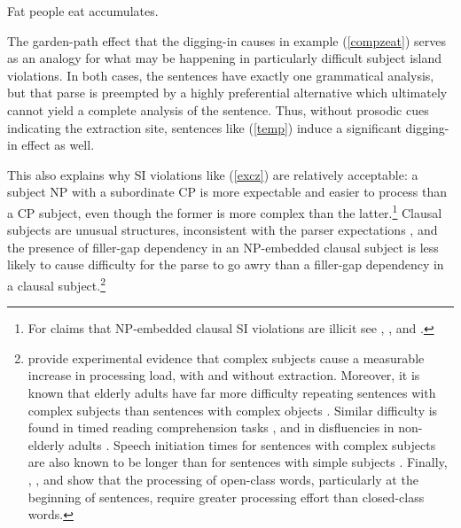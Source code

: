 \documentclass[output=paper
 	        ,biblatex
                ,babelshorthands
                ,newtxmath
                ,draftmode
                ,colorlinks, citecolor=brown
]{langscibook}
\begin{document}
\ea \label{compzeat} Fat people eat accumulates.
\z 

\noindent
The garden-path effect that the digging-in causes in example (\ref{compzeat}) serves as an analogy
for what may be happening in particularly difficult subject island violations.  In both cases, the
sentences have exactly one grammatical analysis, but that parse is preempted by a highly
preferential alternative which ultimately cannot yield a complete analysis of the sentence.  Thus,
without prosodic cues indicating the extraction site, sentences like (\ref{temp}) induce a
significant digging-in effect as well.


\eal \label{temp}
\zl

This also explains why SI violations like (\ref{excz}) are relatively acceptable: a subject NP with
a subordinate CP is more expectable and easier to process than a CP subject, even though the former
is more complex than the latter.\footnote{For claims that NP-embedded clausal SI violations are
  illicit see \citet[42]{lasniksaito}, \citet[796]{colinphillips}, and \citet[67]{colin_horn}.}
Clausal subjects are unusual structures, inconsistent with the parser expectations \citep{fod74},
and the presence of filler-gap dependency in an NP-embedded clausal subject is less likely to cause
difficulty for the parse to go awry than a filler-gap dependency in a clausal
subject.\footnote{\citet{clausen,clausencuny} provide experimental evidence that complex subjects
  cause a measurable increase in processing load, with and without extraction. Moreover, it is known
  that elderly adults have far more difficulty repeating sentences with complex subjects than
  sentences with complex objects \citep{kemper86}. Similar difficulty is found in timed reading
  comprehension tasks \citep{kynette}, and in disfluencies in non-elderly adults \citep{clarkwasow}.
  Speech initiation times for sentences with complex subjects are also known to be longer than for
  sentences with simple subjects \citep{ferreirasubj,tsiam}.  Finally, \citet{garnsey},
  \citet{kutasetal}, and \citet{vanpetten} show that the processing of open-class words,
  particularly at the beginning of sentences, require greater processing effort than closed-class
  words.}
\end{document}
